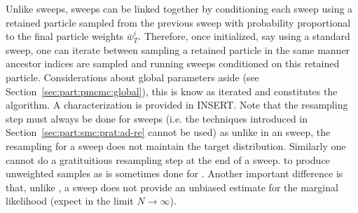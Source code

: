 Unlike \smc sweeps, \csmc sweeps can be linked together by conditioning each sweep using a retained particle
sampled from the previous sweep with probability proportional to the final particle weights $\bar{w}^i_T$.
Therefore, once initialized, say using a standard \smc sweep, one can iterate between sampling a retained
particle in the same manner ancestor indices are sampled and running \csmc sweeps conditioned on this
retained particle.  Considerations about global parameters aside (see Section~\ref{sec:part:pmcmc:global}), this is know
as iterated \csmc and constitutes the \pg algorithm.  A characterization is provided in INSERT. 
Note that the resampling step must always be done for \csmc sweeps (i.e. the techniques introduced in
Section~\ref{sec:part:smc:prat:ad-re} cannot be used) as unlike in an \smc sweep, the resampling for
a \csmc sweep does not maintain the target distribution.  Similarly one cannot do a gratituitious resampling
step at the end of a \csmc sweep. to produce unweighted samples as is sometimes done for \smc.  Another
important difference is that, unlike \smc, a \csmc sweep does not provide an unbiased estimate for the
marginal likelihood (expect in the limit $N\rightarrow\infty$).


